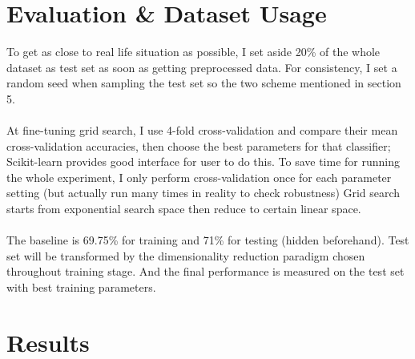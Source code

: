 \documentclass[11pt,a4paper]{article}
\begin{document}
\section{Evaluation \& Dataset Usage} 

To get as close to real life situation as possible, I set aside 20\% of the whole dataset as test set as soon as getting preprocessed data. For consistency, I set a random seed when sampling the test set so the two scheme mentioned in section 5. \\\\
At fine-tuning grid search, I use 4-fold cross-validation and compare their mean cross-validation accuracies, then choose the best parameters for that classifier; Scikit-learn provides good interface for user to do this. To save time for running the whole experiment, I only perform cross-validation once for each parameter setting (but actually run many times in reality to check robustness) Grid search starts from exponential search space then reduce to certain linear space.\\\\
The baseline is 69.75\% for training and 71\% for testing (hidden beforehand). Test set will be transformed by the dimensionality reduction paradigm chosen throughout training stage. And the final performance is measured on the test set with best training parameters.


\section{Results} 
\end{document}
